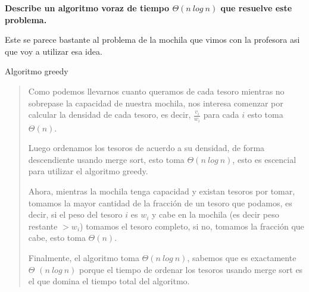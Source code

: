 \textbf{Describe un algoritmo voraz de tiempo $\Theta(n \ log \ n)$ que resuelve este problema.}\vspace{.2cm}

Este se parece bastante al problema de la mochila que vimos con la profesora asi que voy a utilizar esa idea. \vspace{.2cm}

\textcolor{bibi}{Algoritmo greedy }
\begin{quote}
    Como podemos llevarnos cuanto queramos de cada tesoro mientras no sobrepase la capacidad de nuestra mochila, nos interesa comenzar por calcular la densidad de cada tesoro, es decir, $\frac{v_i}{w_i}$ para cada $i$ esto toma $\Theta(n)$. \vspace{.2cm}

    Luego ordenamos los tesoros de acuerdo a su densidad, de forma descendiente usando merge sort, esto toma $\Theta(n \ log \ n)$, esto es escencial para utilizar el algoritmo greedy. \vspace{.2cm}

    Ahora, mientras la mochila tenga capacidad y existan tesoros por tomar, tomamos la mayor cantidad de la fracción de un tesoro que podamos, es decir, si el peso del tesoro $i$ es $w_i$ y cabe en la mochila (es decir peso restante $> w_i$) tomamos el tesoro completo, si no, tomamos la fracción que cabe, esto toma $\Theta(n)$. \vspace{.2cm}

    Finalmente, el algoritmo toma $\Theta(n \ log \ n)$, sabemos que es exactamente $\Theta$ $(n \ log \ n)$ porque el tiempo de ordenar los tesoros usando merge sort es el que domina el tiempo total del algoritmo. \vspace{.2cm}
\end{quote}